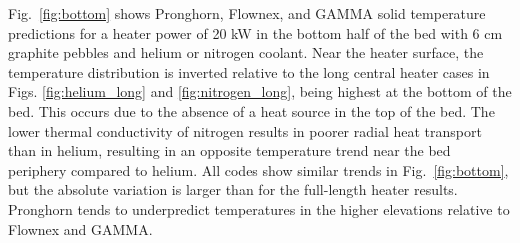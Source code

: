 Fig.\ \ref{fig:bottom} shows Pronghorn, Flownex, and GAMMA solid temperature predictions for a heater power of 20 \si{\kilo\watt} in the bottom half of the bed with 6 \si{\centi\meter} graphite pebbles and helium or nitrogen coolant. Near the heater surface, the temperature distribution is inverted relative to the long central heater cases in Figs. \ref{fig:helium_long} and \ref{fig:nitrogen_long}, being highest at the bottom of the bed. This occurs due to the absence of a heat source in the top of the bed. The lower thermal conductivity of nitrogen results in poorer radial heat transport than in helium, resulting in an opposite temperature trend near the bed periphery compared to helium. All codes show similar trends in Fig.\ \ref{fig:bottom}, but the absolute variation is larger than for the full-length heater results. Pronghorn tends to underpredict temperatures in the higher elevations relative to Flownex and GAMMA. 

